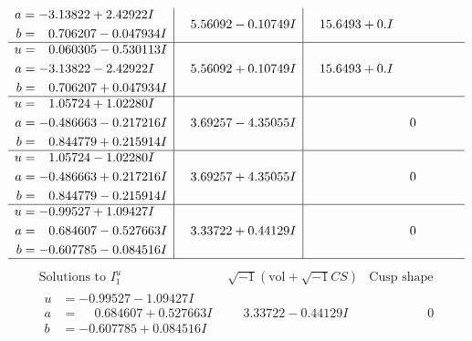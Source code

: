 \documentclass[1p]{elsarticle_modified}
\theoremstyle{definition}
\newcommand{\I}{\sqrt{-1}}
\begin{document}
$$\begin{array}{c|c|c}
\begin{aligned}
a &= -3.13822 + 2.42922 I \\
b &= \phantom{-}0.706207 - 0.047934 I\end{aligned}
 & \phantom{-}5.56092 - 0.10749 I & \phantom{-}15.6493 + 0. I\phantom{ +0.000000I} \\ \hline\begin{aligned}
u &= \phantom{-}0.060305 - 0.530113 I \\
a &= -3.13822 - 2.42922 I \\
b &= \phantom{-}0.706207 + 0.047934 I\end{aligned}
 & \phantom{-}5.56092 + 0.10749 I & \phantom{-}15.6493 + 0. I\phantom{ +0.000000I} \\ \hline\begin{aligned}
u &= \phantom{-}1.05724 + 1.02280 I \\
a &= -0.486663 - 0.217216 I \\
b &= \phantom{-}0.844779 + 0.215914 I\end{aligned}
 & \phantom{-}3.69257 - 4.35055 I & \phantom{-0.000000 } 0 \\ \hline\begin{aligned}
u &= \phantom{-}1.05724 - 1.02280 I \\
a &= -0.486663 + 0.217216 I \\
b &= \phantom{-}0.844779 - 0.215914 I\end{aligned}
 & \phantom{-}3.69257 + 4.35055 I & \phantom{-0.000000 } 0 \\ \hline\begin{aligned}
u &= -0.99527 + 1.09427 I \\
a &= \phantom{-}0.684607 - 0.527663 I \\
b &= -0.607785 - 0.084516 I\end{aligned}
 & \phantom{-}3.33722 + 0.44129 I & \phantom{-0.000000 } 0\\
 \hline 
 \end{array}$$\newpage$$\begin{array}{c|c|c}  
\text{Solutions to }I^u_{1}& \I (\text{vol} + \sqrt{-1}CS) & \text{Cusp shape}\\
 \hline 
\begin{aligned}
u &= -0.99527 - 1.09427 I \\
a &= \phantom{-}0.684607 + 0.527663 I \\
b &= -0.607785 + 0.084516 I\end{aligned}
 & \phantom{-}3.33722 - 0.44129 I & \phantom{-0.000000 } 0 \\ \hline\begin{aligned}

\end{aligned}
\end{array}$$
\end{document}
